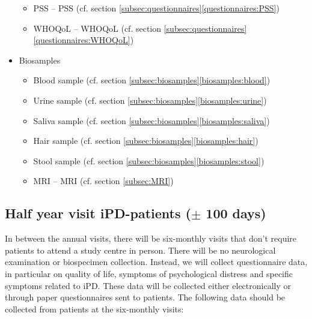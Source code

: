 \begin{itemize}[noitemsep,topsep=0pt]
\begin{itemize}[noitemsep,topsep=0pt]
\item \acl{PSS} -- \acs{PSS} (cf. section \ref{subsec:questionnaires}\ref{questionnaires:PSS})
\item \acl{WHOQoL} -- \acs{WHOQoL} (cf. section \ref{subsec:questionnaires}\ref{questionnaires:WHOQoL})
\end{itemize}
\item Biosamples
\begin{itemize}[noitemsep,topsep=0pt]
\item Blood sample (cf. section \ref{subsec:biosamples}\ref{biosamples:blood})
\item Urine sample (cf. section \ref{subsec:biosamples}\ref{biosamples:urine})
\item Saliva sample (cf. section \ref{subsec:biosamples}\ref{biosamples:saliva})
\item Hair sample (cf. section \ref{subsec:biosamples}\ref{biosamples:hair})
\item Stool sample (cf. section \ref{subsec:biosamples}\ref{biosamples:stool})
\item \acl{MRI} -- \acs{MRI} (cf. section \ref{subsec:MRI}) 
\end{itemize}
\end{itemize}

\subsection{Half year visit \ac{iPD}-patients ($\pm$ 100 days)}
In between the annual visits, there will be six-monthly visits that don't require patients to attend a study centre in person. There will be no neurological examination or biospecimen collection. Instead, we will collect questionnaire data, in particular on quality of life, symptoms of psychological distress and specific symptoms related to \ac{iPD}. These data will be collected either electronically or through paper questionnaires sent to patients. The following data should be collected from patients at the six-monthly visits:

